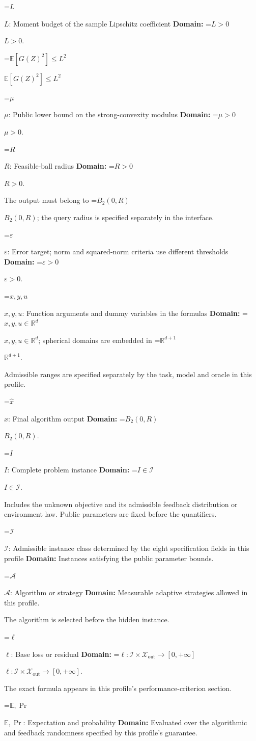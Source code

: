 \documentclass[10pt,a4paper]{article}
\newcommand{\AtlasMath}[1]{\par\begingroup\centering\setbox0=\hbox{$\displaystyle #1$}\ifdim\wd0>1.4\linewidth\typeout{ATLAS WIDE FORMULA: \the\wd0}\fi\ifdim\wd0>\linewidth\resizebox{\linewidth}{!}{\box0}\else\box0\fi\par\endgroup}
\newcommand{\AtlasInlineMath}[1]{\begingroup\setbox0=\hbox{$#1$}\ifdim\wd0>.4\linewidth\endgroup\AtlasMath{#1}\else\endgroup$#1$\fi}
\begin{document}
\AtlasInlineMath{L}: Moment budget of the sample Lipschitz coefficient \textbf{Domain:} \AtlasInlineMath{L>0}.

\AtlasInlineMath{\mathbb{E}[G(Z)^2]\le L^2}

\AtlasInlineMath{\mu}: Public lower bound on the strong-convexity modulus \textbf{Domain:} \AtlasInlineMath{\mu>0}.

\AtlasInlineMath{R}: Feasible-ball radius \textbf{Domain:} \AtlasInlineMath{R>0}.

The output must belong to \AtlasInlineMath{B_2(0,R)}; the query radius is specified separately in the interface.

\AtlasInlineMath{\varepsilon}: Error target; norm and squared-norm criteria use different thresholds \textbf{Domain:} \AtlasInlineMath{\varepsilon>0}.

\AtlasInlineMath{x,y,u}: Function arguments and dummy variables in the formulas \textbf{Domain:} \AtlasInlineMath{x,y,u\in\mathbb{R}^d}; spherical domains are embedded in \AtlasInlineMath{\mathbb{R}^{d+1}}.

Admissible ranges are specified separately by the task, model and oracle in this profile.

\AtlasInlineMath{\widehat{x}}: Final algorithm output \textbf{Domain:} \AtlasInlineMath{B_2(0,R)}.

\AtlasInlineMath{I}: Complete problem instance \textbf{Domain:} \AtlasInlineMath{I\in\mathcal{I}}.

Includes the unknown objective and its admissible feedback distribution or environment law. Public parameters are fixed before the quantifiers.

\AtlasInlineMath{\mathcal{I}}: Admissible instance class determined by the eight specification fields in this profile \textbf{Domain:} Instances satisfying the public parameter bounds.

\AtlasInlineMath{\mathcal{A}}: Algorithm or strategy \textbf{Domain:} Measurable adaptive strategies allowed in this profile.

The algorithm is selected before the hidden instance.

\AtlasInlineMath{\ell}: Base loss or residual \textbf{Domain:} \AtlasInlineMath{\ell:\mathcal{I}\times\mathcal{X}_{\mathrm{out}}\to[0,+\infty]}.

The exact formula appears in this profile's performance-criterion section.

\AtlasInlineMath{\mathbb{E},\Pr}: Expectation and probability \textbf{Domain:} Evaluated over the algorithmic and feedback randomness specified by this profile's guarantee.
\end{document}
